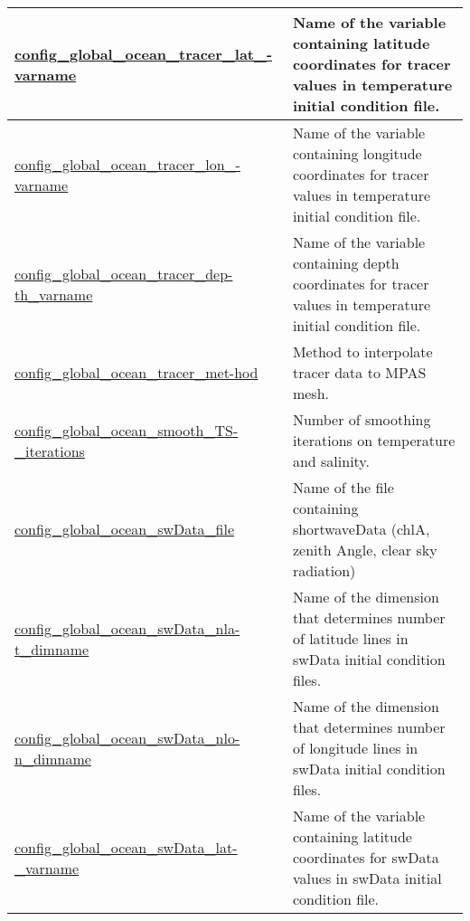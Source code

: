 {\begin{center}
\begin{longtable}{| p{2.0in} || p{4.0in} |}
    \hline
    \hyperref[subsec:nm_sec_config_global_ocean_tracer_lat_varname]{config\_global\_ocean\_tracer\_lat\_-}\hyperref[subsec:nm_sec_config_global_ocean_tracer_lat_varname]{varname}& Name of the variable containing latitude coordinates for tracer values in temperature initial condition file. \\
    \hline
    \hyperref[subsec:nm_sec_config_global_ocean_tracer_lon_varname]{config\_global\_ocean\_tracer\_lon\_-}\hyperref[subsec:nm_sec_config_global_ocean_tracer_lon_varname]{varname}& Name of the variable containing longitude coordinates for tracer values in temperature initial condition file. \\
    \hline
    \hyperref[subsec:nm_sec_config_global_ocean_tracer_depth_varname]{config\_global\_ocean\_tracer\_dep-}\hyperref[subsec:nm_sec_config_global_ocean_tracer_depth_varname]{th\_varname}& Name of the variable containing depth coordinates for tracer values in temperature initial condition file. \\
    \hline
    \hyperref[subsec:nm_sec_config_global_ocean_tracer_method]{config\_global\_ocean\_tracer\_met-}\hyperref[subsec:nm_sec_config_global_ocean_tracer_method]{hod}& Method to interpolate tracer data to MPAS mesh. \\
    \hline
    \hyperref[subsec:nm_sec_config_global_ocean_smooth_TS_iterations]{config\_global\_ocean\_smooth\_TS-}\hyperref[subsec:nm_sec_config_global_ocean_smooth_TS_iterations]{\_iterations}& Number of smoothing iterations on temperature and salinity. \\
    \hline
    \hyperref[subsec:nm_sec_config_global_ocean_swData_file]{config\_global\_ocean\_swData\_file} & Name of the file containing shortwaveData (chlA, zenith Angle, clear sky radiation) \\
    \hline
    \hyperref[subsec:nm_sec_config_global_ocean_swData_nlat_dimname]{config\_global\_ocean\_swData\_nla-}\hyperref[subsec:nm_sec_config_global_ocean_swData_nlat_dimname]{t\_dimname}& Name of the dimension that determines number of latitude lines in swData initial condition files. \\
    \hline
    \hyperref[subsec:nm_sec_config_global_ocean_swData_nlon_dimname]{config\_global\_ocean\_swData\_nlo-}\hyperref[subsec:nm_sec_config_global_ocean_swData_nlon_dimname]{n\_dimname}& Name of the dimension that determines number of longitude lines in swData initial condition files. \\
    \hline
    \hyperref[subsec:nm_sec_config_global_ocean_swData_lat_varname]{config\_global\_ocean\_swData\_lat-}\hyperref[subsec:nm_sec_config_global_ocean_swData_lat_varname]{\_varname}& Name of the variable containing latitude coordinates for swData values in swData initial condition file. \\

\end{longtable}
\end{center}}
